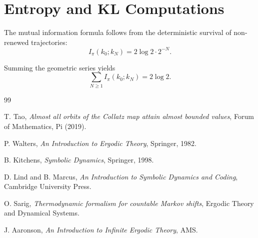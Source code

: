 \documentclass[11pt]{article}
\begin{document}
\section{Entropy and KL Computations}

The mutual information formula follows from the deterministic survival of
non-renewed trajectories:
\[
I_\pi(k_0;k_N)
=
2\log2\cdot2^{-N}.
\]

Summing the geometric series yields
\[
\sum_{N\ge1}I_\pi(k_0;k_N)=2\log2.
\]

\begin{thebibliography}{99}

T. Tao,
\emph{Almost all orbits of the Collatz map attain almost bounded values},
Forum of Mathematics, Pi (2019).

P. Walters,
\emph{An Introduction to Ergodic Theory},
Springer, 1982.

B. Kitchens,
\emph{Symbolic Dynamics},
Springer, 1998.

D. Lind and B. Marcus,
\emph{An Introduction to Symbolic Dynamics and Coding},
Cambridge University Press.

O. Sarig,
\emph{Thermodynamic formalism for countable Markov shifts},
Ergodic Theory and Dynamical Systems.

J. Aaronson,
\emph{An Introduction to Infinite Ergodic Theory},
AMS.

\end{thebibliography}
\end{document}
